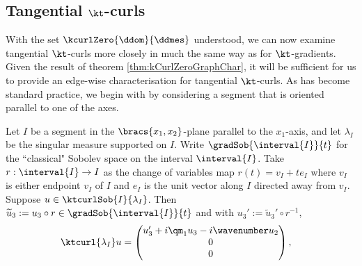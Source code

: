 \subsection{Tangential $\kt$-curls} \label{sec:ktCurlsTangential}
With the set $\kcurlZero{\ddom}{\ddmes}$ understood, we can now examine tangential $\kt$-curls more closely in much the same way as for $\kt$-gradients.
Given the result of theorem \ref{thm:kCurlZeroGraphChar}, it will be sufficient for us to provide an edge-wise characterisation for tangential $\kt$-curls.
As has become standard practice, we begin with by considering a segment that is oriented parallel to one of the axes.
\begin{lemma} \label{lem:ktTanCurlSegmentParallel}
	Let $I$ be a segment in the $\bracs{x_1,x_2}$-plane parallel to the $x_1$-axis, and let $\lambda_I$ be the singular measure supported on $I$.
	Write $\gradSob{\interval{I}}{t}$ for the ``classical" Sobolev space on the interval $\interval{I}$.
	Take $r:\interval{I}\rightarrow I$ as the change of variables map $r(t) = v_I + te_I$ where $v_I$ is either endpoint $v_I$ of $I$ and $e_I$ is the unit vector along $I$ directed away from $v_I$.
	Suppose $u\in\ktcurlSob{I}{\lambda_I}$.
	Then $\widetilde{u}_3 := u_3 \circ r \in\gradSob{\interval{I}}{t}$ and with $u_3' := \widetilde{u}_3' \circ r^{-1}$,
	\begin{align*}
		\ktcurl{\lambda_I}u &= 
		\begin{pmatrix} u_3' + i\qm_1 u_3 - i\wavenumber u_2 \\ 0 \\ 0 \end{pmatrix},
	\end{align*}
\end{lemma}
